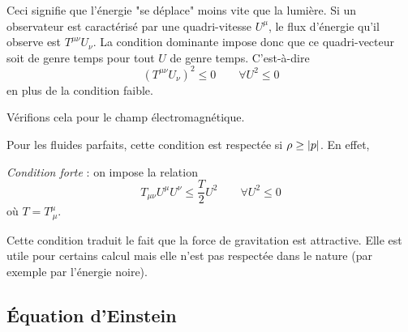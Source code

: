 \documentclass[a4paper,11pt]{report}
\begin{document}
            Ceci signifie que l'énergie "se déplace" moins vite que la lumière. Si un observateur est caractérisé par une quadri-vitesse $U^\mu$, le flux d'énergie qu'il observe est $T^{\mu\nu}U_\nu$. La condition dominante impose donc que ce quadri-vecteur soit de genre temps pour tout $U$ de genre temps. C'est-à-dire
            \begin{equation}
                (T^{\mu\nu}U_\nu)^2\leq0 \qquad\forall U^2\leq0
            \end{equation}
            en plus de la condition faible.
            
            \begin{exmp}
                Vérifions cela pour le champ électromagnétique.
                \comp
            \end{exmp}
            
            \begin{exmp}
                Pour les fluides parfaits, cette condition est respectée si $\rho\geq\abs{p}$. En effet,
                \comp
            \end{exmp}
            
            \begin{definition}
                \textit{Condition forte} : on impose la relation
                \begin{equation}
                    T_{\mu\nu}U^\mu U^\nu \leq \frac{T}{2} U^2\qquad \forall U^2\leq0
                \end{equation}
                où $T = T^\mu_{~\mu}$.
            \end{definition}
        
            Cette condition traduit le fait que la force de gravitation est attractive. Elle est utile pour certains calcul mais elle n'est pas respectée dans le nature (par exemple par l'énergie noire).

        \subsection{Équation d'Einstein}
        
\end{document}
